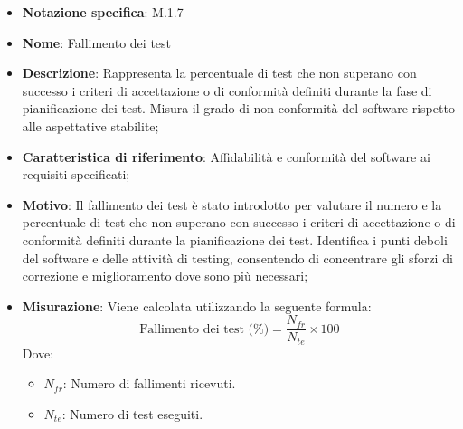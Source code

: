\begin{itemize}
    \item \textbf{Notazione specifica}: M.1.7
    \item \textbf{Nome}: Fallimento dei test
    \item \textbf{Descrizione}: Rappresenta la percentuale di test che non superano con successo i criteri di accettazione o di conformità definiti durante la fase di pianificazione dei test. Misura il grado di non conformità del software rispetto alle aspettative stabilite;
    \item \textbf{Caratteristica di riferimento}: Affidabilità e conformità del software ai requisiti specificati;
    \item \textbf{Motivo}: Il fallimento dei test è stato introdotto per valutare il numero e la percentuale di test che non superano con successo i criteri di accettazione o di conformità definiti durante la pianificazione dei test. Identifica i punti deboli del software e delle attività di testing, consentendo di concentrare gli sforzi di correzione e miglioramento dove sono più necessari;
    \item \textbf{Misurazione}: Viene calcolata utilizzando la seguente formula:
    \[
    \text{Fallimento dei test (\%)} = \frac{N_{fr}}{N_{te}} \times 100
    \]
    Dove:
    \begin{itemize}
        \item $N_{fr}$: Numero di fallimenti ricevuti.
        \item $N_{te}$: Numero di test eseguiti.
    \end{itemize}
\end{itemize}